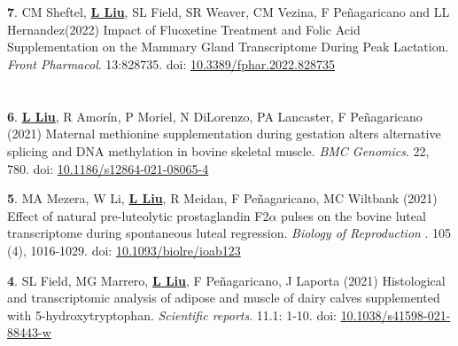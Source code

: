 \documentclass[margin,line,10pt]{res}
\newenvironment{list1}{
  \begin{list}{\ding{113}}{%
      \setlength{\itemsep}{0in}
      \setlength{\parsep}{0in} \setlength{\parskip}{0in}
      \setlength{\topsep}{0in} \setlength{\partopsep}{0in} 
      \setlength{\leftmargin}{0.17in}}}{\end{list}}
\begin{document}
\begin{resume}
\begin{list1}
    \vspace{0.2cm}
\end{list1}


\section{}
\begin{list1}
\item [{\bf 7}.] CM Sheftel, \textbf{\underline{L Liu}}, SL Field, SR Weaver, CM Vezina, F Peñagaricano and LL Hernandez(2022) Impact of Fluoxetine Treatment and Folic Acid Supplementation on the Mammary Gland Transcriptome During Peak Lactation. \emph{Front Pharmacol}. 13:828735. doi: \textcolor{blue}{\href{https://doi.org/10.3389/fphar.2022.828735}{10.3389/fphar.2022.828735}}
    \vspace{0.2cm}
\end{list1}


\section{}
\begin{list1}
    
\item [{\bf 6}.] \textbf{\underline{L Liu}}, R Amorín, P Moriel, N DiLorenzo, PA Lancaster, F Peñagaricano (2021) Maternal methionine supplementation during gestation alters alternative splicing and DNA methylation in bovine skeletal muscle. \emph{BMC Genomics}. 22, 780. doi: \textcolor{blue}{\href{https://doi.org/10.1186/s12864-021-08065-4}{10.1186/s12864-021-08065-4}}
    \vspace{0.2cm}

\item [{\bf 5}.] MA Mezera, W Li, \textbf{\underline{L Liu}}, R Meidan, F Pe\~{n}agaricano, MC Wiltbank (2021) Effect of natural pre-luteolytic prostaglandin F2\(\alpha\) pulses on the bovine luteal transcriptome during spontaneous luteal regression. \emph{Biology of Reproduction }. 105 (4), 1016-1029. doi: \textcolor{blue}{\href{https://doi.org/10.1093/biolre/ioab123}{10.1093/biolre/ioab123}}
    \vspace{0.2cm}
    
\item [{\bf 4}.] SL Field, MG Marrero, \textbf{\underline{L Liu}}, F Pe\~{n}agaricano, J Laporta (2021) Histological and transcriptomic analysis of adipose and muscle of dairy calves supplemented with 5-hydroxytryptophan. \emph{Scientific reports}. 11.1: 1-10. doi: \textcolor{blue}{\href{https://doi.org/10.1038/s41598-021-88443-w}{10.1038/s41598-021-88443-w}}
    \vspace{0.2cm}
\end{list1}


\end{resume}
\end{document}
